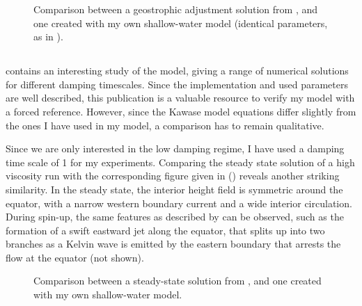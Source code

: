 \begin{figure}
		\hfill%
		\caption[Comparison between a geostrophic adjustment solution from \cite{killworth}, and one created with my own shallow-water model.]{Comparison between a geostrophic adjustment solution from \cite{killworth}, and one created with my own shallow-water model (identical parameters, as in ).}
		\label{fig:killworth-comp}
\end{figure}

\subsection{\cite{greatbatch}}
\cite{greatbatch} contains an interesting study of the \cite{kawase} model, giving a range of numerical solutions for different damping timescales. Since the implementation and used parameters are well described, this publication is a valuable resource to verify my model with a forced reference. However, since the Kawase model equations differ slightly from the ones I have used in my model, a comparison has to remain qualitative.

Since we are only interested in the low damping regime, I have used a damping time scale of \SI{1}{\year} for my experiments. Comparing the steady state solution of a high viscosity run with the corresponding figure given in \cite{greatbatch} () reveals another striking similarity. In the steady state, the interior height field is symmetric around the equator, with a narrow western boundary current and a wide interior circulation. During spin-up, the same features as described by \citeauthor{greatbatch} can be observed, such as the formation of a swift eastward jet along the equator, that splits up into two branches as a Kelvin wave is emitted by the eastern boundary that arrests the flow at the equator (not shown).

\begin{figure}
	\caption{Comparison between a steady-state solution from \cite{greatbatch}, and one created with my own shallow-water model.}
	\label{fig:greatbatch-comp}
\end{figure}